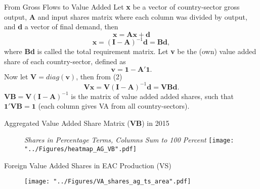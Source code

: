 \documentclass[compress]{beamer}
\newenvironment{noheadline}{
    \setbeamertemplate{headline}{}
    \addtobeamertemplate{frametitle}{\vspace*{-0.9\baselineskip}}{}
}{}
\begin{document}
\begin{noheadline}

\begin{frame}{From Gross Flows to Value Added}
Let \textbf{x} be a vector of country-sector gross output, \textbf{A} and input shares matrix where each column was divided by output, and \textbf{d} a vector of final demand, then
\begin{equation}
\textbf{x} = \textbf{A}\textbf{x} + \textbf{d}
\end{equation}
\begin{equation} \label{eq:leontief}
\textbf{x} = (\textbf{I}-\textbf{A})^{-1} \textbf{d} = \textbf{B}\textbf{d},
\end{equation}
where \textbf{Bd} is called the total requirement matrix. Let \textbf{v} be the (own) value added share of each country-sector, defined as
\begin{equation}
\textbf{v} = \textbf{1} - \textbf{A}'\textbf{1}.
\end{equation}
Now let $\textbf{V} = diag(\textbf{v})$, then from (2)
\begin{equation} \label{eq:VB}
\textbf{V}\textbf{x} = \textbf{V}(\textbf{I}-\textbf{A})^{-1} \textbf{d} = \textbf{VBd}.
\end{equation}
$\textbf{VB} = \textbf{V}(\textbf{I}-\textbf{A})^{-1}$ is the matrix of value added added shares, such that $\textbf{1}'\textbf{VB} = \textbf{1}$ (each column gives VA from all country-sectors). 
\end{frame}

\begin{frame}{Aggregated Value Added Share Matrix (\textbf{VB}) in 2015}
\begin{figure}[h!]
\centering
\small{\textit{Shares in Percentage Terms, Columns Sum to 100 Percent}}
\texttt{[image: "../Figures/heatmap\_AG\_VB".pdf]} %
\end{figure}
\end{frame}

\begin{frame}{Foreign Value Added Shares in EAC Production (VS)}
\begin{figure}[h!]
\centering
\texttt{[image: "../Figures/VA\_shares\_ag\_ts\_area".pdf]} %
\end{figure}
\end{frame}


\end{noheadline}
\end{document}
